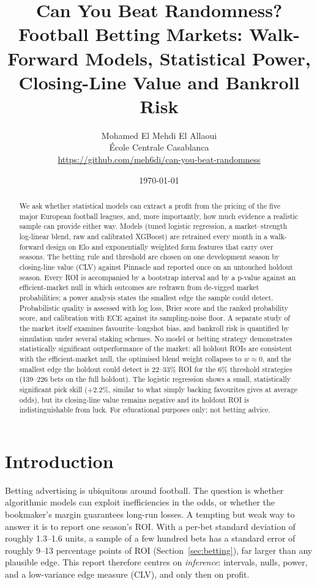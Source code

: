 \documentclass[11pt,a4paper]{article}
\title{\textbf{Can You Beat Randomness?}\\[4pt]
\large Football Betting Markets: Walk-Forward Models, Statistical Power,\\ Closing-Line Value and Bankroll Risk}
\author{Mohamed El Mehdi El Allaoui\\
\small \'Ecole Centrale Casablanca\\
\small \url{https://github.com/meh6di/can-you-beat-randomness}}
\date{\today}
\begin{document}
\maketitle

\begin{abstract}
We ask whether statistical models can extract a profit from the pricing of the five major European football leagues, and, more importantly, how much evidence a realistic sample can provide either way. Models (tuned logistic regression, a market--strength log-linear blend, raw and calibrated XGBoost) are retrained every month in a walk-forward design on Elo and exponentially weighted form features that carry over seasons. The betting rule and threshold are chosen on one development season by closing-line value (CLV) against Pinnacle and reported once on an untouched holdout season. Every ROI is accompanied by a bootstrap interval and by a p-value against an efficient-market null in which outcomes are redrawn from de-vigged market probabilities; a power analysis states the smallest edge the sample could detect. Probabilistic quality is assessed with log loss, Brier score and the ranked probability score, and calibration with ECE against its sampling-noise floor. A separate study of the market itself examines favourite--longshot bias, and bankroll risk is quantified by simulation under several staking schemes. No model or betting strategy demonstrates statistically significant outperformance of the market: all holdout ROIs are consistent with the efficient-market null, the optimised blend weight collapses to $w\approx0$, and the smallest edge the holdout could detect is 22--33\% ROI for the 6\% threshold strategies (139--226 bets on the full holdout). The logistic regression shows a small, statistically significant pick skill ($+2.2\%$, similar to what simply backing favourites gives at average odds), but its closing-line value remains negative and its holdout ROI is indistinguishable from luck. For educational purposes only; not betting advice.
\end{abstract}

\tableofcontents
\newpage

\section{Introduction}
Betting advertising is ubiquitous around football. The question is whether algorithmic models can exploit inefficiencies in the odds, or whether the bookmaker's margin guarantees long-run losses. A tempting but weak way to answer it is to report one season's ROI. With a per-bet standard deviation of roughly 1.3--1.6 units, a sample of a few hundred bets has a standard error of roughly 9--13 percentage points of ROI (Section~\ref{sec:betting}), far larger than any plausible edge. This report therefore centres on \emph{inference}: intervals, nulls, power, and a low-variance edge measure (CLV), and only then on profit.
\end{document}
